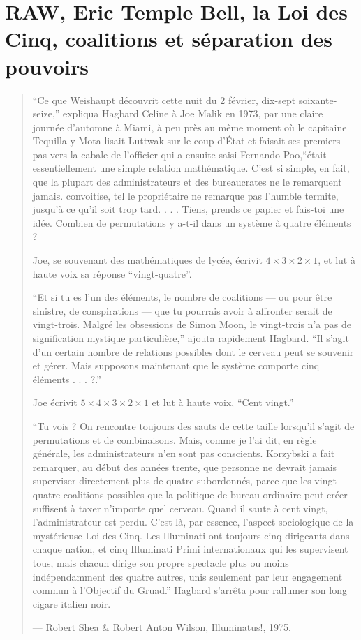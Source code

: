 \chapter[Coalitions et séparation des pouvoirs]{RAW, Eric Temple Bell, la Loi des Cinq, coalitions et séparation des pouvoirs}

\blockquote{
\small{``Ce que Weishaupt découvrit cette nuit du 2 février, dix-sept soixante-seize,'' expliqua Hagbard Celine à Joe Malik en 1973, par une claire journée d'automne à Miami, à peu près au même moment où le capitaine Tequilla y Mota lisait Luttwak sur le coup d'État et faisait ses premiers pas vers la cabale de l'officier qui a ensuite saisi Fernando Poo,``était essentiellement une simple relation mathématique. C'est si simple, en fait, que la plupart des administrateurs et des bureaucrates ne le remarquent jamais. convoitise, tel le propriétaire ne remarque pas l'humble termite, jusqu'à ce qu'il soit trop tard. . . . Tiens, prends ce papier et fais-toi une idée. Combien de permutations y a-t-il dans un système à quatre éléments ?

Joe, se souvenant des mathématiques de lycée, écrivit $4\times3\times2\times1$, et lut à haute voix sa réponse ``vingt-quatre''.

``Et si tu es l'un des éléments, le nombre de coalitions --- ou pour être sinistre, de conspirations --- que tu pourrais avoir à affronter serait de vingt-trois. Malgré les obsessions de Simon Moon, le vingt-trois n'a pas de signification mystique particulière,'' ajouta rapidement Hagbard. ``Il s'agit d'un certain nombre de relations possibles dont le cerveau peut se souvenir et gérer. Mais supposons maintenant que le système comporte cinq éléments . . . ?.''

Joe écrivit $5\times4\times3\times2\times1$ et lut à haute voix, ``Cent vingt.''

``Tu vois ? On rencontre toujours des sauts de cette taille lorsqu'il s'agit de permutations et de combinaisons. Mais, comme je l'ai dit, en règle générale, les administrateurs n'en sont pas conscients. Korzybski a fait remarquer, au début des années trente, que personne ne devrait jamais superviser directement plus de quatre subordonnés, parce que les vingt-quatre coalitions possibles que la politique de bureau ordinaire peut créer suffisent à taxer n'importe quel cerveau. Quand il saute à cent vingt, l'administrateur est perdu. C'est là, par essence, l'aspect sociologique de la mystérieuse Loi des Cinq. Les Illuminati ont toujours cinq dirigeants dans chaque nation, et cinq Illuminati Primi internationaux qui les supervisent tous, mais chacun dirige son propre spectacle plus ou moins indépendamment des quatre autres, unis seulement par leur engagement commun à l'Objectif du Gruad.'' Hagbard s'arrêta pour rallumer son long cigare italien noir.}
\par\begin{flushright} \textup{--- Robert Shea \& Robert Anton Wilson}, Illuminatus!, 1975. \end{flushright}
}

